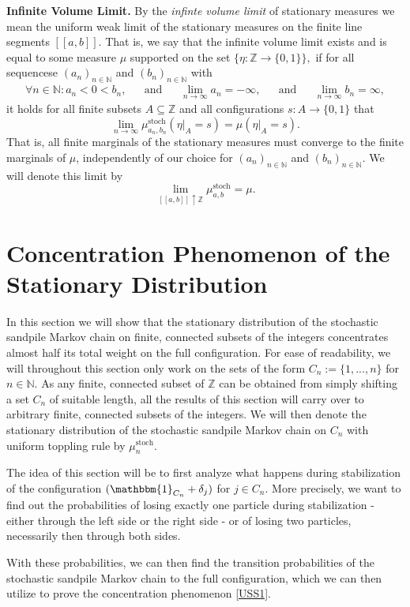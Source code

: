 \documentclass[11pt]{article}
\newcommand{\N}{\mathbb{N}}
\newcommand{\Z}{\mathbb{Z}}
\newcommand{\stoch}{\text{stoch}}
\newcommand{\stat}[2]{\mu^{\stoch}_{#1,#2}}
\newcommand{\statn}[1]{\mu^{\stoch}_{#1}}
\newcommand{\one}{\mathbbm{1}}
\begin{document}
\textbf{Infinite Volume Limit.} By the {\it infinte volume limit} of stationary measures we mean the uniform weak limit of the stationary measures on the finite line segments $[[a,b]]$. That is, we say that the infinite volume limit exists and is equal to some measure $\mu$ supported on the set
$\{\eta:\Z\rightarrow \{0,1\}\},$
if for all sequencese $(a_n)_{n\in\N}$ and $(b_n)_{n\in\N}$ with
\begin{align*}
    \forall n\in\N: a_n<0<b_n,&&\text{and}&&\lim_{n\rightarrow\infty}a_n=-\infty,&&\text{and}&&\lim_{n\rightarrow\infty}b_n=\infty,
\end{align*}
it holds for all finite subsets $A\subseteq \Z$ and all configurations $s:A\rightarrow\{0,1\}$ that
$$\lim_{n\rightarrow\infty}\stat{a_n}{b_n}(\eta|_A=s)=\mu(\eta|_A=s).$$
That is, all finite marginals of the stationary measures must converge to the finite marginals of $\mu$, independently of our choice for $(a_n)_{n\in\N}$ and $(b_n)_{n\in\N}.$ We will denote this limit by
$$\lim_{[[a,b]]\uparrow\Z}\stat{a}{b}=\mu.$$
\section{Concentration Phenomenon of the Stationary Distribution}\label{sec:concentration}
In this section we will show that the stationary distribution of the stochastic sandpile Markov chain on finite, connected subsets of the integers concentrates almost half its total weight on the full configuration. For ease of readability, we will throughout this section only work on the sets of the form $C_n:=\{1,...,n\}$ for $n\in\N$. As any finite, connected subset of $\Z$ can be obtained from simply shifting a set $C_n$ of suitable length, all the results of this section will carry over to arbitrary finite, connected subsets of the integers. We will then denote the stationary distribution of the stochastic sandpile Markov chain on $C_n$ with uniform toppling rule by $\statn{n}$.

The idea of this section will be to first analyze what happens during stabilization of the configuration $(\one_{C_n}+\delta_j)$ for $j\in C_n$. More precisely, we want to find out the probabilities of losing exactly one particle during stabilization - either through the left side or the right side - or of losing two particles, necessarily then through both sides.

With these probabilities, we can then find the transition probabilities of the stochastic sandpile Markov chain to the full configuration, which we can then utilize to prove the concentration phenomenon \ref{USS1}.
\end{document}

